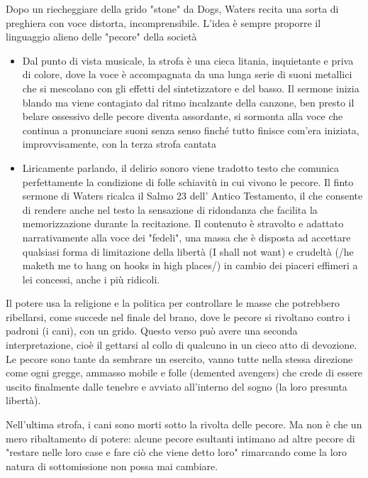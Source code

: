 \documentclass[class=book, crop=false, oneside, 12pt]{standalone}
\begin{document}
    Dopo un riecheggiare della grido "stone" da Dogs, Waters recita una sorta di preghiera con voce distorta, incomprensibile. L'idea è sempre proporre il linguaggio alieno delle "pecore" della società

    \begin{itemize}
        \item Dal punto di vista musicale, la strofa è una cieca litania, inquietante e priva di colore, dove la voce è accompagnata da una lunga serie di suoni metallici che si mescolano con gli effetti del sintetizzatore e del basso. Il sermone inizia blando ma viene contagiato dal ritmo incalzante della canzone, ben presto il belare ossessivo delle pecore diventa assordante, si sormonta alla voce che continua a pronunciare suoni senza senso finché tutto finisce com'era iniziata, improvvisamente, con la terza strofa cantata
        \item Liricamente parlando, il delirio sonoro viene tradotto testo che comunica perfettamente la condizione di folle schiavitù in cui vivono le pecore. Il finto sermone di Waters ricalca il Salmo 23 dell' Antico Testamento, il che consente di rendere anche nel testo la sensazione di ridondanza che facilita la memorizzazione durante la recitazione. Il contenuto è stravolto e adattato narrativamente alla voce dei  "fedeli", una massa che è disposta ad accettare qualsiasi forma di limitazione della libertà (I shall not want) e crudeltà (/he maketh me to hang on hooks in high places/) in cambio dei piaceri effimeri a lei concessi, anche i più ridicoli.
    \end{itemize}

    Il potere usa la religione e la politica per controllare le masse che potrebbero ribellarsi, come succede nel finale del brano, dove le pecore si rivoltano contro i padroni (i cani), con un grido. Questo verso può avere una seconda interpretazione, cioè il gettarsi al collo di qualcuno in un cieco atto di devozione. Le pecore sono tante da sembrare un esercito, vanno tutte nella stessa direzione come ogni gregge, ammasso mobile e folle (demented avengers) che crede di essere uscito finalmente dalle tenebre e avviato all'interno del sogno (la loro presunta libertà).

    Nell'ultima strofa, i cani sono morti sotto la rivolta delle pecore. Ma non è che un mero ribaltamento di potere: alcune pecore esultanti intimano ad altre pecore di "restare nelle loro case e fare ciò che viene detto loro" rimarcando come la loro natura di sottomissione non possa mai cambiare.
\end{document}
